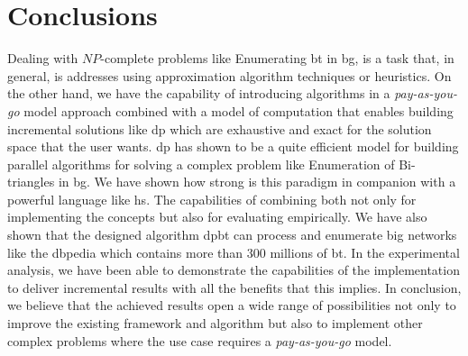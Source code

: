 \section{Conclusions}
Dealing with $NP$-complete problems like Enumerating \acrlong{bt} in \acrlong{bg}, is a task that, in general, is addresses using approximation algorithm techniques or heuristics. 
On the other hand, we have the capability of introducing algorithms in a \emph{pay-as-you-go} model approach combined with a model of computation that enables building incremental solutions like \acrshort{dp} which are exhaustive and exact for the solution space that the user wants.    
\acrfull{dp} has shown to be a quite efficient model for building parallel algorithms for solving a complex problem like Enumeration of Bi-triangles in \acrlong{bg}.
We have shown how strong is this paradigm in companion with a powerful language like \acrfull{hs}. The capabilities of combining both not only for implementing the concepts but also for evaluating empirically. 
We have also shown that the designed algorithm \acrshort{dpbt} can process and enumerate big networks like the \acrlong{dbpedia} which contains more than $300$ millions of \acrlong{bt}.
In the experimental analysis, we have been able to demonstrate the capabilities of the implementation to deliver incremental results with all the benefits that this implies. 
In conclusion, we believe that the achieved results open a wide range of possibilities not only to improve the existing framework and algorithm but also to implement other complex problems where the use case requires a \emph{pay-as-you-go} model.
